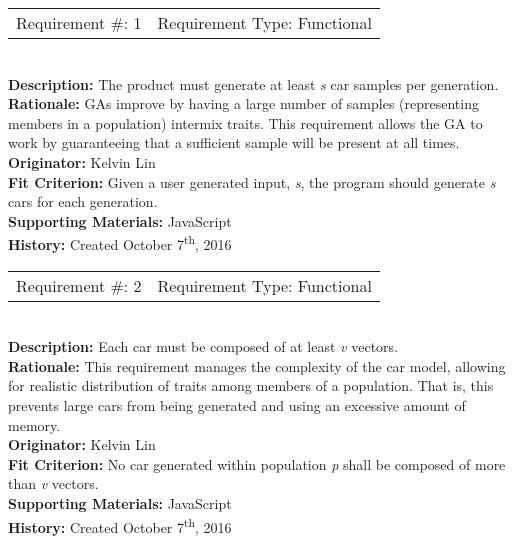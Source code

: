 \documentclass[12pt, titlepage]{article}
\begin{document}
\begin{reqbox}
%
\begin{tabular}{cc}
Requirement \#: 1 & Requirement Type: Functional \\
\end{tabular} \\
%
\textbf{Description:} The product must generate at least \textit{s} car samples 
per generation. \\
\textbf{Rationale:}  GAs improve by having a large number of samples 
(representing members in a population) intermix traits. This requirement allows 
the GA to work by guaranteeing that a sufficient sample will be present at all 
times.\\
\textbf{Originator:} Kelvin Lin\\
\textbf{Fit Criterion:} Given a user generated input, \textit{s}, the program 
should generate \textit{s} cars for each generation.\\
%  
\textbf{Supporting Materials:} JavaScript \\
\textbf{History:} Created October 7\textsuperscript{th}, 2016
%
\end{reqbox}

\begin{reqbox}
%
\begin{tabular}{cc}
Requirement \#: 2 & Requirement Type: Functional \\
\end{tabular} \\
%
\textbf{Description:} Each car must be composed of at least \textit{v} vectors. 
\\
\textbf{Rationale:}  This requirement manages the complexity of the car model, 
allowing for realistic distribution of traits among members of a population. 
That is, this prevents large cars from being generated and using an excessive 
amount of memory. \\
\textbf{Originator:} Kelvin Lin\\
\textbf{Fit Criterion:} No car generated within population \textit{p} shall be 
composed of more than \textit{v} vectors.\\
%  
\textbf{Supporting Materials:} JavaScript \\
\textbf{History:} Created October 7\textsuperscript{th}, 2016
%
\end{reqbox}

\newpage
\end{document}

